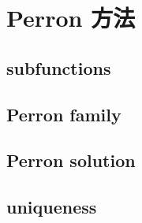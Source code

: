 \section{Perron 方法}
\label{b3:sec:1602}


\subsection{subfunctions}
\label{b3:subsec:160201}

\subsection{Perron family}
\label{b3:subsec:160202}

\subsection{Perron solution}
\label{b3:subsec:160203}

\subsection{uniqueness}
\label{b3:subsec:160204}


